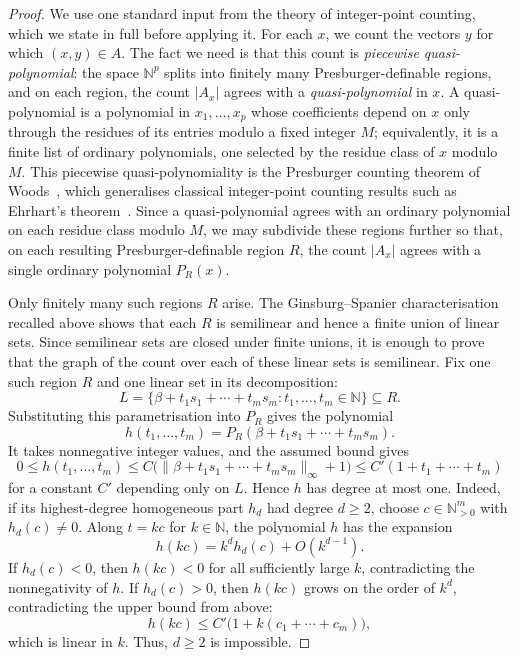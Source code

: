 \documentclass[11pt]{article}
\theoremstyle{definition}
\newcommand{\N}{\mathbb N}
\begin{document}
\begin{proof}
We use one standard input from the theory of integer-point counting, which we
state in full before applying it.  For each $x$, we count the vectors $y$ for
which $(x,y)\in A$.  The fact we need is that this count is \emph{piecewise
quasi-polynomial}: the space $\N^p$ splits into finitely many
Presburger-definable regions, and on each
region, the count $|A_x|$ agrees with a \emph{quasi-polynomial} in $x$.  A
quasi-polynomial is a polynomial in $x_1,\ldots,x_p$ whose coefficients depend on
$x$ only through the residues of its entries modulo a fixed integer $M$;
equivalently, it is a finite list of ordinary polynomials, one selected by the
residue class of $x$ modulo $M$.  This piecewise quasi-polynomiality is the
Presburger counting theorem of Woods~\cite[Theorem~1.10]{Woods2015}, which
generalises classical integer-point counting results such as Ehrhart's
theorem~\cite{Ehrhart1962}.
Since a quasi-polynomial agrees with an ordinary polynomial on each residue
class modulo $M$, we may subdivide these regions further so that, on each
resulting Presburger-definable region $R$, the count $|A_x|$ agrees with a
single ordinary polynomial $P_R(x)$.

Only finitely many such regions $R$ arise.  The Ginsburg--Spanier
characterisation recalled above shows that each $R$ is semilinear and hence a
finite union of linear sets.  Since semilinear sets are closed under finite
unions, it is enough to prove that the graph of the count over each of these
linear sets is semilinear.  Fix one such region $R$ and one linear set in its
decomposition:
\[
   L=\{\beta+t_1s_1+\cdots+t_ms_m:t_1,\ldots,t_m\in\N\}\subseteq R.
\]
Substituting this parametrisation into $P_R$ gives the polynomial
\[
   h(t_1,\ldots,t_m)
   =P_R(\beta+t_1s_1+\cdots+t_ms_m).
\]
It takes nonnegative integer values, and the assumed bound gives
\[
   0\le h(t_1,\ldots,t_m)
   \le C\bigl(\|\beta+t_1s_1+\cdots+t_ms_m\|_\infty+1\bigr)
   \le C'(1+t_1+\cdots+t_m)
\]
for a constant $C'$ depending only on $L$.  Hence $h$ has degree at most one.
Indeed, if its highest-degree homogeneous part $h_d$ had degree $d\ge2$, choose
$c\in\N_{>0}^m$ with $h_d(c)\ne0$.  Along $t=kc$ for $k\in\N$, the polynomial $h$ has the expansion
\[
   h(kc)=k^d h_d(c)+O(k^{d-1}).
\]
If $h_d(c)<0$, then $h(kc)<0$ for all sufficiently large $k$, contradicting
the nonnegativity of $h$.  If $h_d(c)>0$, then $h(kc)$ grows on the order of
$k^d$, contradicting the upper bound from above:
\[
   h(kc)\le C'\bigl(1+k(c_1+\cdots+c_m)\bigr),
\]
which is linear in $k$.  Thus, $d\ge2$ is impossible.


\end{proof}
\end{document}
